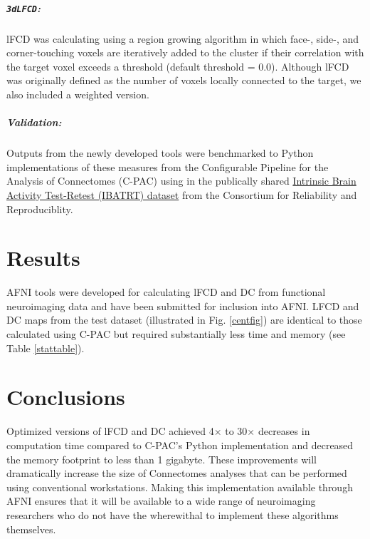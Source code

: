 \documentclass[twocolumn]{bmcart}%
\begin{document}
\subparagraph{\texorpdfstring{\texttt{3dLFCD}:}{:}}\label{section-1}

lFCD was calculating using a region growing algorithm in which face-,
side-, and corner-touching voxels are iteratively added to the cluster
if their correlation with the target voxel exceeds a threshold (default
threshold = 0.0). Although lFCD was originally defined as the number of
voxels locally connected to the target, we also included a weighted
version.

\subparagraph{Validation:}\label{validation}

Outputs from the newly developed tools were benchmarked to Python
implementations of these measures from the Configurable Pipeline for the
Analysis of Connectomes (C-PAC) \cite{Craddock2013c} using in the
publically shared
\href{http://fcon_1000.projects.nitrc.org/indi/CoRR/html/ibatrt.html}{Intrinsic Brain Activity Test-Retest (IBATRT) dataset}
from the Consortium for Reliability and Reproduciblity\cite{Zuo2014}.

\section{Results}\label{results}

AFNI tools were developed for calculating lFCD and DC from functional
neuroimaging data and have been submitted for inclusion into AFNI. LFCD
and DC maps from the test dataset (illustrated in Fig. \ref{centfig})
are identical to those calculated using C-PAC but required substantially
less time and memory (see Table \ref{stattable}).

\section{Conclusions}\label{conclusions}

Optimized versions of lFCD and DC achieved 4\(\times\) to 30\(\times\)
decreases in computation time compared to C-PAC's Python implementation
and decreased the memory footprint to less than 1 gigabyte. These
improvements will dramatically increase the size of Connectomes analyses
that can be performed using conventional workstations. Making this
implementation available through AFNI ensures that it will be available
to a wide range of neuroimaging researchers who do not have the
wherewithal to implement these algorithms themselves.

\end{document}
